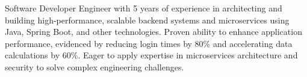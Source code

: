 \documentclass[10pt,a4paper,ragged2e, normalphoto]{altacv}
\begin{document}

\begin{fullwidth}
\makecvheader
\smallskip
Software Developer Engineer with 5 years of experience in architecting and building high-performance, scalable backend systems and microservices using Java, Spring Boot, and other technologies. Proven ability to enhance application performance, evidenced by reducing login times by 80\% and accelerating data calculations by 60\%. Eager to apply expertise in microservices architecture and security to solve complex engineering challenges.\newline
\end{fullwidth}



\end{document}
